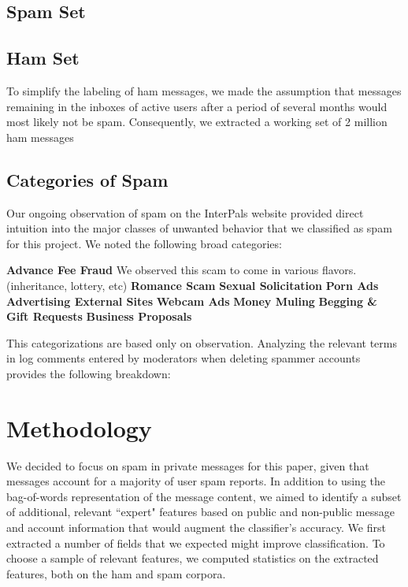 \documentclass[preprint]{acm_proc_article-sp}
\begin{document}
\subsection{Spam Set}



\subsection{Ham Set}

To simplify the labeling of ham messages, we made the assumption that messages remaining in the inboxes of active users after a period of several months would most likely not be spam. Consequently, we extracted a working set of 2 million ham messages 

\subsection{Categories of Spam}

Our ongoing observation of spam on the InterPals website provided direct intuition into the major classes of unwanted behavior that we classified as spam for this project. We noted the following broad categories:

\textbf{Advance Fee Fraud} We observed this scam to come in various flavors.  (inheritance, lottery,  etc)
\textbf{Romance Scam} 
\textbf{Sexual Solicitation}
\textbf{Porn Ads}
\textbf{Advertising External Sites}
\textbf{Webcam Ads}
\textbf{Money Muling}
\textbf{Begging \& Gift Requests}
\textbf{Business Proposals}


This categorizations are based only on observation. Analyzing the relevant terms in log comments entered by moderators when deleting spammer accounts provides the following breakdown:



\section{Methodology}

We decided to focus on spam in private messages for this paper, given that messages account for a majority of user spam reports. In addition to using the bag-of-words representation of the message content, we aimed to identify a subset of additional, relevant ``expert" features based on public and non-public message and account information that would augment the classifier's accuracy. We first extracted a number of fields that we expected might improve classification. To choose a sample of relevant features, we computed statistics on the extracted features, both on the ham and spam corpora.
\end{document}
